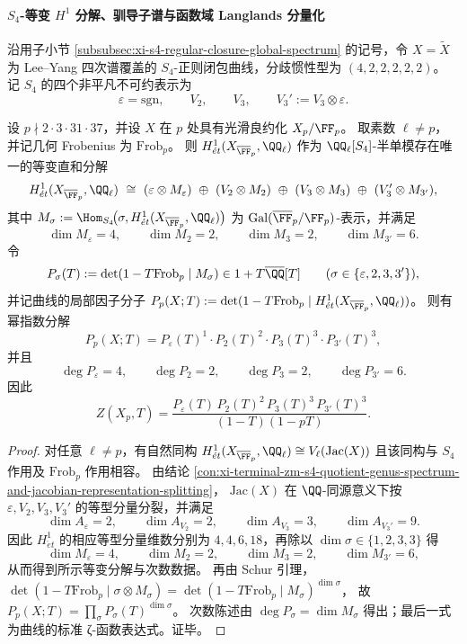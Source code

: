 \paragraph{\texorpdfstring{$S_4$}{S4}-等变 \texorpdfstring{$H^1$}{H1} 分解、驯导子谱与函数域 Langlands 分量化}
沿用子小节 \ref{subsubsec:xi-s4-regular-closure-global-spectrum} 的记号，令
\(
X=\widetilde X
\)
为 Lee--Yang 四次谱覆盖的 \(S_4\)-正则闭包曲线，分歧惯性型为 \((4,2,2,2,2,2)\)。
记 \(S_4\) 的四个非平凡不可约表示为
\[
\varepsilon=\mathrm{sgn},\qquad V_2,\qquad V_3,\qquad V_3':=V_3\otimes\varepsilon.
\]

\begin{conclusion}\label{con:xi-terminal-zm-s4-equivariant-weil-artin-isotypic-factorization}
设 \(p\nmid 2\cdot 3\cdot 31\cdot 37\)，并设 \(X\) 在 \(p\) 处具有光滑良约化 \(X_p/\FF_p\)。
取素数 \(\ell\neq p\)，并记几何 Frobenius 为 \(\mathrm{Frob}_p\)。
则 \(H^1_{\acute et}(X_{\overline{\FF}_p},\QQ_\ell)\) 作为 \(\QQ_\ell[S_4]\)-半单模存在唯一的等变直和分解
\[
H^1_{\acute et}(X_{\overline{\FF}_p},\QQ_\ell)
\ \cong\
(\varepsilon\otimes M_{\varepsilon})
\ \oplus\
(V_2\otimes M_{2})
\ \oplus\
(V_3\otimes M_{3})
\ \oplus\
(V_3'\otimes M_{3'}),
\]
其中
\(
M_\sigma:=\Hom_{S_4}\!\bigl(\sigma,H^1_{\acute et}(X_{\overline{\FF}_p},\QQ_\ell)\bigr)
\)
为 \(\mathrm{Gal}(\overline{\FF}_p/\FF_p)\)-表示，并满足
\[
\dim M_{\varepsilon}=4,\qquad
\dim M_{2}=2,\qquad
\dim M_{3}=2,\qquad
\dim M_{3'}=6.
\]
令
\[
P_\sigma(T):=\det\!\left(1-T\mathrm{Frob}_p\mid M_\sigma\right)\in 1+T\overline{\QQ}[T]
\qquad(\sigma\in\{\varepsilon,2,3,3'\}),
\]
并记曲线的局部因子分子
\(
P_p(X;T):=\det(1-T\mathrm{Frob}_p\mid H^1_{\acute et}(X_{\overline{\FF}_p},\QQ_\ell))
\)。
则有幂指数分解
\[
P_p(X;T)=P_{\varepsilon}(T)^{1}\cdot P_{2}(T)^{2}\cdot P_{3}(T)^{3}\cdot P_{3'}(T)^{3},
\]
并且
\[
\deg P_{\varepsilon}=4,\qquad \deg P_{2}=2,\qquad \deg P_{3}=2,\qquad \deg P_{3'}=6.
\]
因此
\[
Z(X_p,T)=\frac{P_{\varepsilon}(T)\,P_{2}(T)^{2}\,P_{3}(T)^{3}\,P_{3'}(T)^{3}}{(1-T)(1-pT)}.
\]
\end{conclusion}
\begin{proof}
对任意 \(\ell\neq p\)，有自然同构
\(
H^1_{\acute et}(X_{\overline{\FF}_p},\QQ_\ell)\cong V_\ell(\mathrm{Jac}(X))
\)
且该同构与 \(S_4\) 作用及 \(\mathrm{Frob}_p\) 作用相容。
由结论 \ref{con:xi-terminal-zm-s4-quotient-genus-spectrum-and-jacobian-representation-splitting}，
\(\mathrm{Jac}(X)\) 在 \(\QQ\)-同源意义下按 \(\varepsilon,V_2,V_3,V_3'\) 的等型分量分裂，并满足
\[
\dim A_{\varepsilon}=2,\qquad
\dim A_{V_2}=2,\qquad
\dim A_{V_3}=3,\qquad
\dim A_{V_3'}=9.
\]
因此 \(H^1_{\acute et}\) 的相应等型分量维数分别为 \(4,4,6,18\)，再除以 \(\dim\sigma\in\{1,2,3,3\}\) 得
\[
\dim M_{\varepsilon}=4,\qquad
\dim M_{2}=2,\qquad
\dim M_{3}=2,\qquad
\dim M_{3'}=6,
\]
从而得到所示等变分解与次数数据。
再由 Schur 引理，
\(
\det(1-T\mathrm{Frob}_p\mid \sigma\otimes M_\sigma)=\det(1-T\mathrm{Frob}_p\mid M_\sigma)^{\dim\sigma}
\)，
故 \(P_p(X;T)=\prod_\sigma P_\sigma(T)^{\dim\sigma}\)。
次数陈述由 \(\deg P_\sigma=\dim M_\sigma\) 得出；最后一式为曲线的标准 ζ-函数表达式。证毕。
\end{proof}

